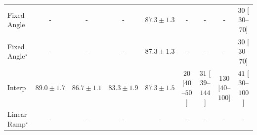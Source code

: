 \begin{tabular}{l|cccc|cccc|}
Fixed Angle & {\cellcolor[HTML]{000000}} \color[HTML]{F1F1F1} {\cellcolor{white}} \color{black} - & {\cellcolor[HTML]{000000}} \color[HTML]{F1F1F1} {\cellcolor{white}} \color{black} - & {\cellcolor[HTML]{000000}} \color[HTML]{F1F1F1} {\cellcolor{white}} \color{black} - & {\cellcolor[HTML]{10743C}} \color[HTML]{F1F1F1} $87.3\pm 1.3$ & {\cellcolor[HTML]{000000}} \color[HTML]{F1F1F1} {\cellcolor{white}} \color{black} - & {\cellcolor[HTML]{000000}} \color[HTML]{F1F1F1} {\cellcolor{white}} \color{black} - & {\cellcolor[HTML]{000000}} \color[HTML]{F1F1F1} {\cellcolor{white}} \color{black} - & {\cellcolor[HTML]{FFF3EF}} \color[HTML]{000000} $30$ [$30$--$70$] \\
Fixed Angle$^\star$ & {\cellcolor[HTML]{000000}} \color[HTML]{F1F1F1} {\cellcolor{white}} \color{black} - & {\cellcolor[HTML]{000000}} \color[HTML]{F1F1F1} {\cellcolor{white}} \color{black} - & {\cellcolor[HTML]{000000}} \color[HTML]{F1F1F1} {\cellcolor{white}} \color{black} - & {\cellcolor[HTML]{10743C}} \color[HTML]{F1F1F1} $87.3\pm 1.3$ & {\cellcolor[HTML]{000000}} \color[HTML]{F1F1F1} {\cellcolor{white}} \color{black} - & {\cellcolor[HTML]{000000}} \color[HTML]{F1F1F1} {\cellcolor{white}} \color{black} - & {\cellcolor[HTML]{000000}} \color[HTML]{F1F1F1} {\cellcolor{white}} \color{black} - & {\cellcolor[HTML]{FFF3EF}} \color[HTML]{000000} $30$ [$30$--$70$] \\
Interp & {\cellcolor[HTML]{006435}} \color[HTML]{F1F1F1} $89.0\pm 1.7$ & {\cellcolor[HTML]{177B3F}} \color[HTML]{F1F1F1} $86.7\pm 1.1$ & {\cellcolor[HTML]{3CA458}} \color[HTML]{F1F1F1} $83.3\pm 1.9$ & {\cellcolor[HTML]{10743C}} \color[HTML]{F1F1F1} $87.3\pm 1.5$ & {\cellcolor[HTML]{FFF5F1}} \color[HTML]{000000} $20$ [$40$--$50$] & {\cellcolor[HTML]{FFF3EF}} \color[HTML]{000000} $31$ [$39$--$144$] & {\cellcolor[HTML]{FDDBD7}} \color[HTML]{000000} $130$ [$40$--$100$] & {\cellcolor[HTML]{FEF0EC}} \color[HTML]{000000} $41$ [$30$--$100$] \\
Linear Ramp$^\star$ & {\cellcolor[HTML]{000000}} \color[HTML]{F1F1F1} {\cellcolor{white}} \color{black} - & {\cellcolor[HTML]{000000}} \color[HTML]{F1F1F1} {\cellcolor{white}} \color{black} - & {\cellcolor[HTML]{000000}} \color[HTML]{F1F1F1} {\cellcolor{white}} \color{black} - & {\cellcolor[HTML]{000000}} \color[HTML]{F1F1F1} {\cellcolor{white}} \color{black} - & {\cellcolor[HTML]{000000}} \color[HTML]{F1F1F1} {\cellcolor{white}} \color{black} - & {\cellcolor[HTML]{000000}} \color[HTML]{F1F1F1} {\cellcolor{white}} \color{black} - & {\cellcolor[HTML]{000000}} \color[HTML]{F1F1F1} {\cellcolor{white}} \color{black} - & {\cellcolor[HTML]{000000}} \color[HTML]{F1F1F1} {\cellcolor{white}} \color{black} - \\

\end{tabular}
